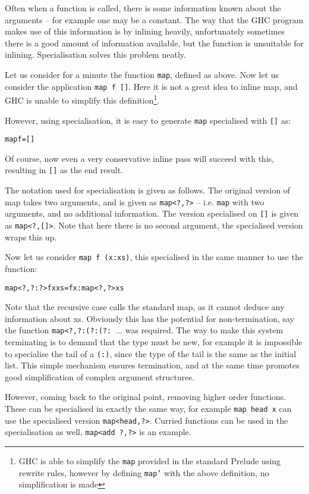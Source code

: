 \documentclass[preprint]{sigplanconf}
\newcommand{\T}[1]{\texttt{#1}}
\newenvironment{code}{\begin{alltt}\small}{\end{alltt}}
\begin{document}
Often when a function is called, there is some information known about the
arguments -- for example one may be a constant. The way that the GHC program
makes use of this information is by inlining heavily, unfortunately sometimes
there is a good amount of information available, but the function is unsuitable
for inlining. Specialisation solves this problem neatly.

Let us consider for a minute the function \T{map}, defined as above. Now let us
consider the application \T{map f []}. Here it is not a great idea to inline
map, and GHC is unable to simplify this definition\footnote{GHC is able to
simplify the \T{map} provided in the standard Prelude using rewrite rules,
however by defining \T{map'} with the above definition, no simplification is
made}.

However, using specialisation, it is easy to generate \T{map} specialised with
\T{[]} as:

\begin{code}
 map f = []
\end{code}

Of course, now even a very conservative inline pass will succeed with this,
resulting in \T{[]} as the end result.

The notation used for specialisation is given as follows. The original version
of map takes two arguments, and is given as \T{map<?,?>} -- i.e. \T{map} with
two arguments, and no additional information. The version specialised on \T{[]}
is given as \T{map<?,[]>}. Note that here there is no second argument, the
specialised version wraps this up.

Now let us consider \T{map f (x:xs)}, this specialised in the same manner to
use the function:

\begin{code}
 map<?,?:?> f x xs = f x : map<?,?> xs
\end{code}

Note that the recursive case calls the standard map, as it cannot deduce any
information about xs. Obviously this has the potential for non-termination, say
the function \T{map<?,?:(?:(?: $\ldots$} was required. The way to make this
system terminating is to demand that the type must be new, for example it is
impossible to specialise the tail of a \T{(:)}, since the type of the tail is
the same as the initial list. This simple mechanism ensures termination, and at
the same time promotes good simplification of complex argument structures.

However, coming back to the original point, removing higher order functions.
These can be specialised in exactly the same way, for example \T{map head x}
can use the specialised version \T{map<head,?>}. Curried functions can be used
in the specialisation as well, \T{map<add ?,?>} is an example.
\end{document}

